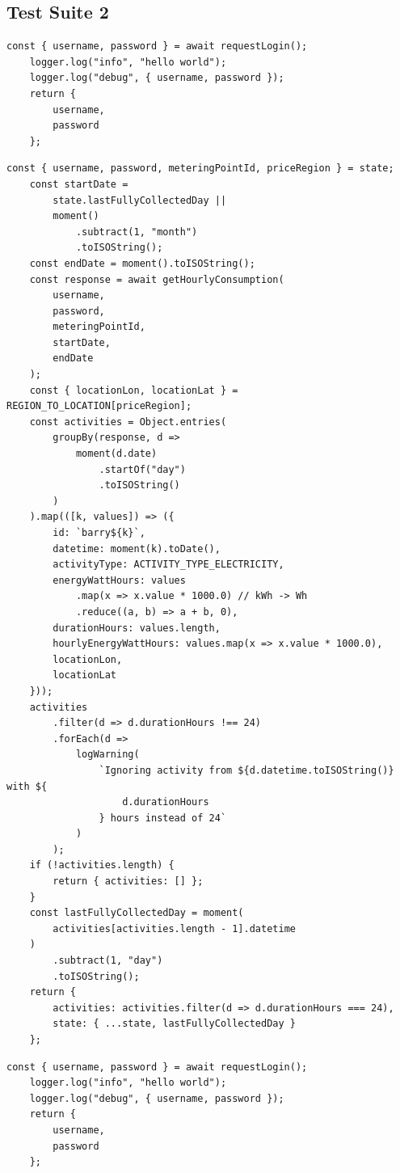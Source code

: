 \documentclass[jou,apacite]{apa6}
\begin{document}
\subsection{Test Suite 2}

\begin{lstlisting}[caption=Comparison 10a - A comparison of the template connect against barry.js's connect]
const { username, password } = await requestLogin();
	logger.log("info", "hello world");
	logger.log("debug", { username, password });
	return {
		username,
		password
	};
\end{lstlisting}

\begin{lstlisting}[caption=Comparison 10b - A comparison of the template connect against barry.js's connect]
const { username, password, meteringPointId, priceRegion } = state;
	const startDate =
		state.lastFullyCollectedDay ||
		moment()
			.subtract(1, "month")
			.toISOString();
	const endDate = moment().toISOString();
	const response = await getHourlyConsumption(
		username,
		password,
		meteringPointId,
		startDate,
		endDate
	);
	const { locationLon, locationLat } = REGION_TO_LOCATION[priceRegion];
	const activities = Object.entries(
		groupBy(response, d =>
			moment(d.date)
				.startOf("day")
				.toISOString()
		)
	).map(([k, values]) => ({
		id: `barry${k}`,
		datetime: moment(k).toDate(),
		activityType: ACTIVITY_TYPE_ELECTRICITY,
		energyWattHours: values
			.map(x => x.value * 1000.0) // kWh -> Wh
			.reduce((a, b) => a + b, 0),
		durationHours: values.length,
		hourlyEnergyWattHours: values.map(x => x.value * 1000.0),
		locationLon,
		locationLat
	}));
	activities
		.filter(d => d.durationHours !== 24)
		.forEach(d =>
			logWarning(
				`Ignoring activity from ${d.datetime.toISOString()} with ${
					d.durationHours
				} hours instead of 24`
			)
		);
	if (!activities.length) {
		return { activities: [] };
	}
	const lastFullyCollectedDay = moment(
		activities[activities.length - 1].datetime
	)
		.subtract(1, "day")
		.toISOString();
	return {
		activities: activities.filter(d => d.durationHours === 24),
		state: { ...state, lastFullyCollectedDay }
	};
\end{lstlisting}

\begin{lstlisting}[caption=Comparison 11a - Template connect against rejsekort.js's logIn Method]
	const { username, password } = await requestLogin();
	logger.log("info", "hello world");
	logger.log("debug", { username, password });
	return {
		username,
		password
	};

\end{lstlisting}
\end{document}

